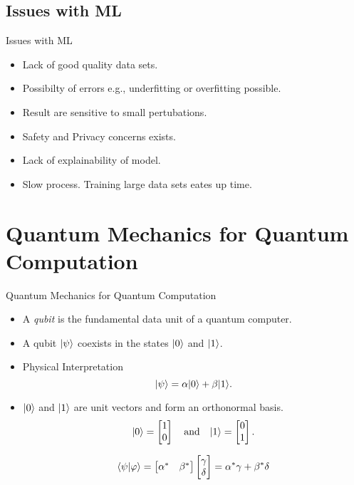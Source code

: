 \documentclass[aspectratio=169, handout]{beamer}
\newcommand{\qbit}{\ensuremath|\psi\rangle}
\newcommand{\qz}{\ensuremath|0\rangle}
\newcommand{\qo}{\ensuremath|1\rangle}
\theoremstyle{example}
\begin{document}
\subsection{Issues with ML}
\begin{frame}{Issues with ML}
\begin{itemize}
\pause\item { Lack of good quality data sets.}
\pause\item { Possibilty of errors e.g., underfitting or overfitting possible.}
\pause\item { Result are sensitive to small pertubations.}
\pause\item { Safety and Privacy concerns exists.}
\pause\item { Lack of explainability of model.}
\pause\item { Slow process. Training large data sets eates up time.}
\end{itemize}
\end{frame}
\section{Quantum Mechanics for Quantum Computation}
\begin{frame}{Quantum Mechanics for Quantum Computation}
  \begin{itemize}
  \pause\item {
   A \emph{qubit} is the fundamental data unit of a quantum computer. 
  }
  \pause\item {
   A qubit $\qbit$ coexists in the states $\qz$ and $\qo$.
  }
  \pause\item {
   Physical Interpretation
  }
  \begin{equation}
\qbit = \alpha\qz + \beta\qo.
\end{equation}
\pause\item {
   $\qz$ and $\qo$ are unit vectors and form an orthonormal basis.
  }
\begin{equation*}
\qz = \begin{bmatrix}1\\0\end{bmatrix} \quad \text{and} \quad \qo = \begin{bmatrix}0\\1\end{bmatrix}.
\end{equation*}
 \pause\begin{definition} \[\braket{\psi|\varphi} = \begin{bmatrix}\alpha^* & \beta^*\end{bmatrix}\begin{bmatrix}\gamma\\\delta\end{bmatrix}=\alpha^*\gamma+\beta^*\delta\]
\end{definition}
  \end{itemize}
\end{frame}
\end{document}
